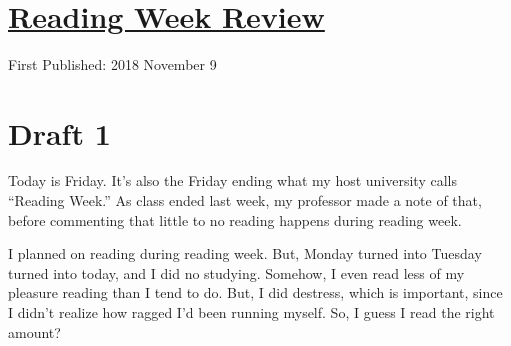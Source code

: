 \documentclass[12pt]{article}[titlepage]
\newcommand{\say}[1]{``#1''}
\newcommand{\1}{\={a}}
\newcommand{\2}{\={e}}
\newcommand{\3}{\={\i}}
\newcommand{\4}{\=o}
\newcommand{\5}{\=u}
\newcommand{\6}{\={A}}
\renewcommand{\,}{\textsuperscript{,}}
\begin{document}

\doublespacing
\section{\href{reading-week.html}{Reading Week Review}}
First Published: 2018 November 9
\section{Draft 1}
Today is Friday.
It's also the Friday ending what my host university calls \say{Reading Week.}
As class ended last week, my professor made a note of that, before commenting that little to no reading happens during reading week.

I planned on reading during reading week.
But, Monday turned into Tuesday turned into today, and I did no studying.
Somehow, I even read less of my pleasure reading than I tend to do.
But, I did destress, which is important, since I didn't realize how ragged I'd been running myself.
So, I guess I read the right amount?
\end{document}
